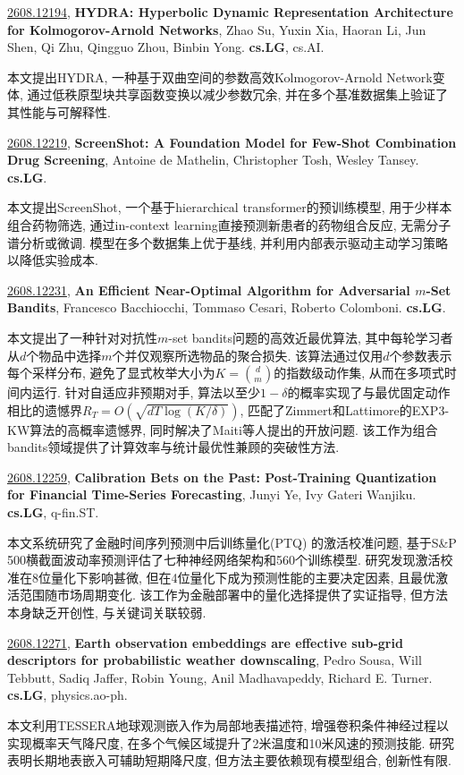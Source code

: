 \documentclass[9pt, a4paper]{article}
\theoremstyle{plain}
\theoremstyle{definition}
\theoremstyle{remark}
\newcommand{\arxivwithtarget}[3]{\hypertarget{#1}{}\href{https://arxiv.org/abs/#1}{#1}, \textbf{\textcolor{arxivblue}{#2}}, #3. }
\begin{document}
\arxivwithtarget{2608.12194}{HYDRA: Hyperbolic Dynamic Representation Architecture for Kolmogorov-Arnold Networks}{Zhao Su, Yuxin Xia, Haoran Li, Jun Shen, Qi Zhu, Qingguo Zhou, Binbin Yong}\textbf{cs.LG}, cs.AI.

本文提出HYDRA, 一种基于双曲空间的参数高效Kolmogorov-Arnold Network变体, 通过低秩原型块共享函数变换以减少参数冗余, 并在多个基准数据集上验证了其性能与可解释性.


\arxivwithtarget{2608.12219}{ScreenShot: A Foundation Model for Few-Shot Combination Drug Screening}{Antoine de Mathelin, Christopher Tosh, Wesley Tansey}\textbf{cs.LG}.

本文提出ScreenShot, 一个基于hierarchical transformer的预训练模型, 用于少样本组合药物筛选, 通过in-context learning直接预测新患者的药物组合反应, 无需分子谱分析或微调. 模型在多个数据集上优于基线, 并利用内部表示驱动主动学习策略以降低实验成本.


\arxivwithtarget{2608.12231}{An Efficient Near-Optimal Algorithm for Adversarial $m$-Set Bandits}{Francesco Bacchiocchi, Tommaso Cesari, Roberto Colomboni}\textbf{cs.LG}.

本文提出了一种针对对抗性$m$-set bandits问题的高效近最优算法, 其中每轮学习者从$d$个物品中选择$m$个并仅观察所选物品的聚合损失. 该算法通过仅用$d$个参数表示每个采样分布, 避免了显式枚举大小为$K=\binom{d}{m}$的指数级动作集, 从而在多项式时间内运行. 针对自适应非预期对手, 算法以至少$1-\delta$的概率实现了与最优固定动作相比的遗憾界$R_T = O(\sqrt{dT\log(K/\delta)})$, 匹配了Zimmert和Lattimore的EXP3-KW算法的高概率遗憾界, 同时解决了Maiti等人提出的开放问题. 该工作为组合bandits领域提供了计算效率与统计最优性兼顾的突破性方法.


\arxivwithtarget{2608.12259}{Calibration Bets on the Past: Post-Training Quantization for Financial Time-Series Forecasting}{Junyi Ye, Ivy Gateri Wanjiku}\textbf{cs.LG}, q-fin.ST.

本文系统研究了金融时间序列预测中后训练量化(PTQ) 的激活校准问题, 基于S&P 500横截面波动率预测评估了七种神经网络架构和560个训练模型. 研究发现激活校准在8位量化下影响甚微, 但在4位量化下成为预测性能的主要决定因素, 且最优激活范围随市场周期变化. 该工作为金融部署中的量化选择提供了实证指导, 但方法本身缺乏开创性, 与关键词关联较弱.


\arxivwithtarget{2608.12271}{Earth observation embeddings are effective sub-grid descriptors for probabilistic weather downscaling}{Pedro Sousa, Will Tebbutt, Sadiq Jaffer, Robin Young, Anil Madhavapeddy, Richard E. Turner}\textbf{cs.LG}, physics.ao-ph.

本文利用TESSERA地球观测嵌入作为局部地表描述符, 增强卷积条件神经过程以实现概率天气降尺度, 在多个气候区域提升了2米温度和10米风速的预测技能. 研究表明长期地表嵌入可辅助短期降尺度, 但方法主要依赖现有模型组合, 创新性有限.
\end{document}
